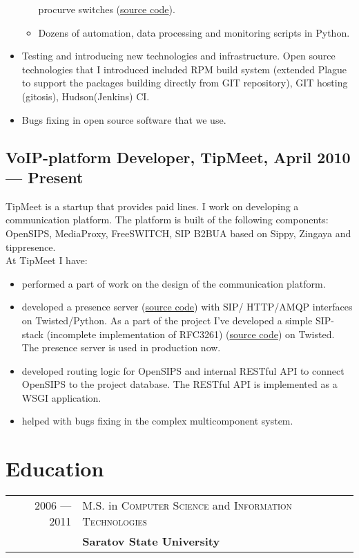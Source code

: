 \documentclass[a4paper,10pt]{article}
\begin{document}
\begin{itemize}
\begin{itemize}
procurve switches (\href{http://git.sgu.ru/?p=aaa\_hp.git;a=summary}{source
code}).
 \item Dozens of automation, data processing and monitoring scripts in Python.
 \end{itemize}
\item Testing and introducing new technologies and infrastructure. Open source
technologies that I introduced included RPM build system (extended Plague to
support the packages building directly from GIT repository), GIT hosting
(gitosis), Hudson(Jenkins) CI.
\item Bugs fixing in open source software that we use.
\end{itemize}

\subsection{VoIP-platform Developer, TipMeet, April 2010 --- Present}
TipMeet is a startup that provides paid lines. I work on developing
a communication platform. The platform is built of the following components:
OpenSIPS, MediaProxy, FreeSWITCH, SIP B2BUA based on Sippy, Zingaya and
tippresence.\\
At TipMeet I have:
\begin{itemize}
\item performed a part of work on the design of the communication platform.
\item developed a presence server
(\href{http://github.com/tipmeet/tippresence}{source code}) with SIP\slash
HTTP\slash AMQP interfaces on Twisted\slash Python. As a part of the project
I've developed a simple SIP-stack (incomplete implementation of RFC3261)
(\href{http://github.com/tipmeet/tipsip}{source code}) on
Twisted. The presence server is used in production now.
\item developed routing logic for OpenSIPS and internal RESTful API
to connect OpenSIPS to the project database. The RESTful API is implemented as
a WSGI application.
\item helped with bugs fixing in the complex multicomponent system.
\end{itemize}


\section{Education}
\begin{tabular}{rl}
2006 --- 2011& M.S. in \textsc{Computer Science} and \textsc{Information
Technologies} \\& \textbf{Saratov State University}
\end{tabular}
\end{document}
